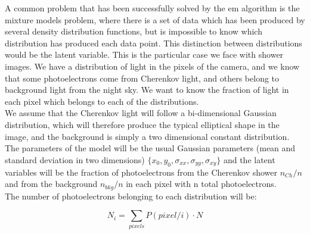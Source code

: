 \documentclass[main.tex]{subfiles}
\begin{document}
A common problem that has been successfully solved by the \gls{em} algorithm is the mixture models problem, where there is a set of data which has been produced by several density distribution functions, but is impossible to know which distribution has produced each data point. This distinction between distributions would be the latent variable. This is the particular case we face with shower images. We have a distribution of light in the pixels of the camera, and we know that some photoelectrons come from Cherenkov light, and others belong to background light from the night sky. We want to know the fraction of light in each pixel which belongs to each of the distributions.\\
We assume that the Cherenkov light will follow a bi-dimensional Gaussian distribution, which will therefore produce the typical elliptical shape in the image, and the background is simply a two dimensional constant distribution. The parameters of the model will be the usual Gaussian parameters (mean and standard deviation in two dimensions) $\{x_{0}, y_{0},\sigma_{xx}, \sigma_{yy}, \sigma_{xy}\}$ and the latent variables will be the fraction of photoelectrons from the Cherenkov shower $n_{Ch}/n$ and from the background $n_{bkg}/n$ in each pixel with n total photoelectrons.\\
The number of photoelectrons belonging to each distribution will be:

\begin{equation}
  N_{i} = \sum_{pixels} P(pixel/i)\cdot N
\end{equation}
\end{document}
